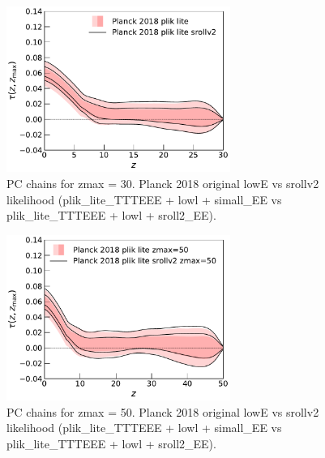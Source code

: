 \documentclass[prd,amsmath,amssymb,floatfix,superscriptaddress,nofootinbib]{revtex4-1}
\begin{document}
\begin{figure}
\includegraphics[width=0.65\textwidth]{results/direct_mcmc/pl18_plots_zmax30/plot_pub_tau_gtz_dz_0p1_pl18_pc_zmax30_pliklite_post_0930_and_pl18_pc_zmax30_pliklite_srollv2_0930.pdf}
\caption{PC chains for zmax = 30. Planck 2018 original lowE vs srollv2 likelihood (plik\_lite\_TTTEEE + lowl + simall\_EE vs plik\_lite\_TTTEEE + lowl + sroll2\_EE).
}
\label{fig:}
\end{figure}

\begin{figure}
\includegraphics[width=0.65\textwidth]{results/direct_mcmc/pl18_plots_zmax50/plot_pub_tau_gtz_dz_0p1_pl18_pc_zmax50_pliklite_post_and_pl18_pc_zmax50_pliklite_srollv2.pdf}
\caption{PC chains for zmax = 50. Planck 2018 original lowE vs srollv2 likelihood (plik\_lite\_TTTEEE + lowl + simall\_EE vs plik\_lite\_TTTEEE + lowl + sroll2\_EE).
}
\label{fig:}
\end{figure}
\end{document}

